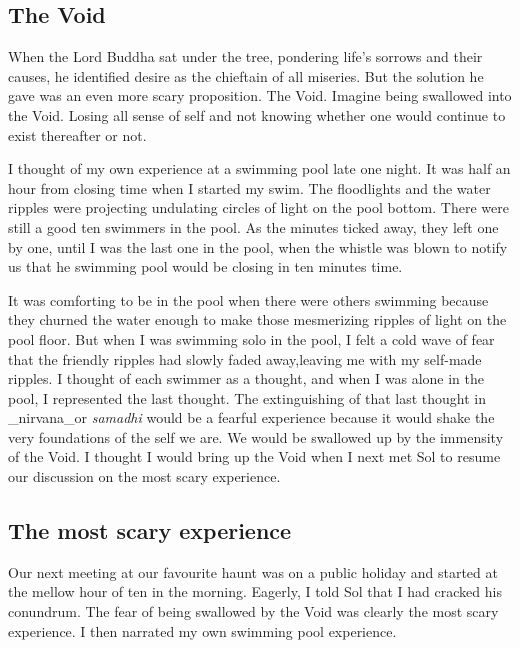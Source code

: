 \documentclass[
  a4paper,
]{article}
\begin{document}
\hypertarget{the-void}{%
\subsection{The Void}\label{the-void}}

When the Lord Buddha sat under the tree, pondering life's sorrows and
their causes, he identified desire as the chieftain of all miseries. But
the solution he gave was an even more scary proposition. The Void.
Imagine being swallowed into the Void. Losing all sense of self and not
knowing whether one would continue to exist thereafter or not.

I thought of my own experience at a swimming pool late one night. It was
half an hour from closing time when I started my swim. The floodlights
and the water ripples were projecting undulating circles of light on the
pool bottom. There were still a good ten swimmers in the pool. As the
minutes ticked away, they left one by one, until I was the last one in
the pool, when the whistle was blown to notify us that he swimming pool
would be closing in ten minutes time.

It was comforting to be in the pool when there were others swimming
because they churned the water enough to make those mesmerizing ripples
of light on the pool floor. But when I was swimming solo in the pool, I
felt a cold wave of fear that the friendly ripples had slowly faded
away,leaving me with my self-made ripples. I thought of each swimmer as
a thought, and when I was alone in the pool, I represented the last
thought. The extinguishing of that last thought in \_nirvana\_or
\emph{samadhi} would be a fearful experience because it would shake the
very foundations of the self we are. We would be swallowed up by the
immensity of the Void. I thought I would bring up the Void when I next
met Sol to resume our discussion on the most scary experience.

\hypertarget{the-most-scary-experience}{%
\subsection{The most scary experience}\label{the-most-scary-experience}}

Our next meeting at our favourite haunt was on a public holiday and
started at the mellow hour of ten in the morning. Eagerly, I told Sol
that I had cracked his conundrum. The fear of being swallowed by the
Void was clearly the most scary experience. I then narrated my own
swimming pool experience.
\end{document}
